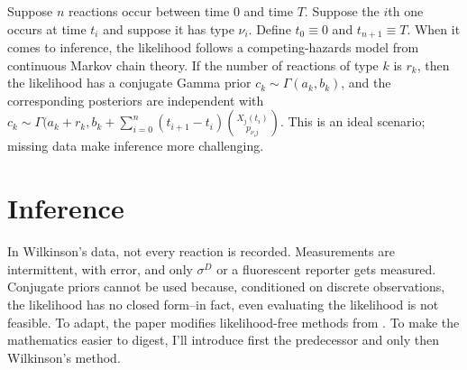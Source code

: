 \documentclass{article}
\newcommand\EMK[1]{\textcolor{purple}{EMK: #1}}
\begin{document}
Suppose $n$ reactions occur between time $0$ and time $T$. Suppose the $i$th one occurs at time $t_{i}$ and suppose it has type $\nu_{i}$. Define $t_0\equiv0$ and $t_{n+1}\equiv T$. When it comes to inference, the likelihood follows a competing-hazards model from continuous Markov chain theory.
If the number of reactions of type $k$ is $r_k$, then the likelihood has a conjugate Gamma prior  
$c_k\sim \Gamma(a_k, b_k)$, and the corresponding posteriors are independent with $c_k\sim \Gamma(a_k+r_k, b_k+\sum_{i=0}^{n} (t_{i+1}-t_{i}) {{X_j(t_{i})}\choose{p_{{\nu_{i}}j}}}$. This is an ideal scenario; missing data make inference more challenging.

\section{Inference}

In Wilkinson's data, not every reaction is recorded. Measurements are intermittent, with error, and only $\sigma^D$ or a fluorescent reporter gets measured. Conjugate priors cannot be used because, conditioned on discrete observations, the likelihood has no closed form--in fact, even evaluating the likelihood is not feasible. 
To adapt, the paper modifies likelihood-free methods from \cite{Marjoram23122003}. To make the mathematics easier to digest, I'll introduce first the predecessor and only then Wilkinson's method. 
\end{document}
